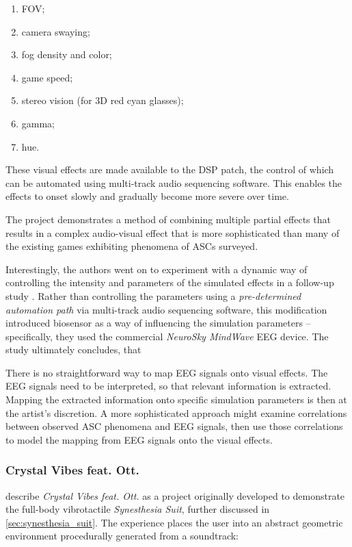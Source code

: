 \begin{enumerate}
    \setlength{\itemsep}{0pt}
    \setlength{\parskip}{0pt}
    \item \ac{FOV};
    \item camera swaying;
    \item fog density and color;
    \item game speed;
    \item stereo vision (for 3D red cyan glasses);
    \item gamma;
    \item hue.
\end{enumerate}

These visual effects are made available to the \ac{DSP} patch, the control of which can be automated using multi-track audio sequencing software. This enables the effects to onset slowly and gradually become more severe over time.

The project demonstrates a method of combining multiple partial effects that results in a complex audio-visual effect that is more sophisticated than many of the existing games exhibiting phenomena of \acp{ASC} surveyed.

Interestingly, the authors went on to experiment with a dynamic way of controlling the intensity and parameters of the simulated effects in a follow-up study \autocite{weinel2015quake}. Rather than controlling the parameters using a \textit{pre-determined automation path} via multi-track audio sequencing software, this modification introduced biosensor as a way of influencing the simulation parameters -- specifically, they used the commercial \textit{NeuroSky MindWave} \ac{EEG} device. The study ultimately concludes, that 

There is no straightforward way to map \ac{EEG} signals onto visual effects. The \ac{EEG} signals need to be interpreted, so that relevant information is extracted. Mapping the extracted information onto specific simulation parameters is then at the artist's discretion. A more sophisticated approach might examine correlations between observed \ac{ASC} phenomena and \ac{EEG} signals, then use those correlations to model the mapping from \ac{EEG} signals onto the visual effects.

\subsubsection{Crystal Vibes feat. Ott.}\label{sec:crystal_vibes}
\textcite{outram2017crystal} describe \textit{Crystal Vibes feat. Ott.} as a project originally developed to demonstrate the full-body vibrotactile \textit{Synesthesia Suit}, further discussed in \ref{sec:synesthesia_suit}. The experience places the user into an abstract geometric environment procedurally generated from a soundtrack:

